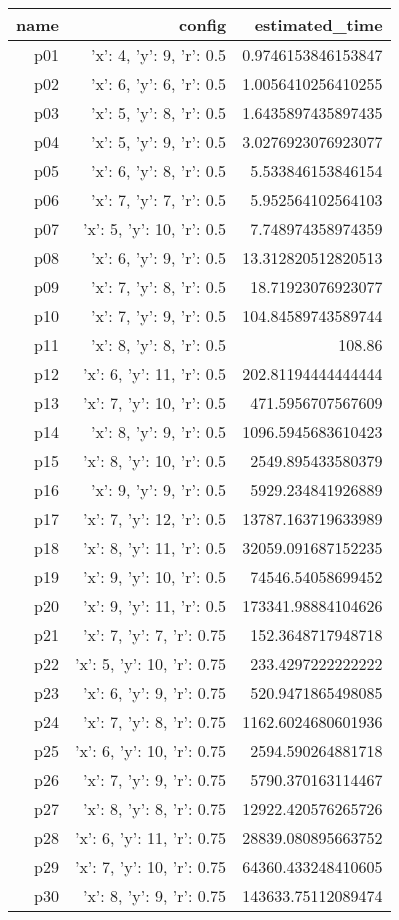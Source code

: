 \documentclass{article}
\begin{document}
                            \begin{center}
                            \scriptsize
                            \begin{tabular}{r|r|r}
                            name & config & estimated\_time\\\midrule
                              p01&{'x': 4, 'y': 9, 'r': 0.5}&0.9746153846153847\\
  p02&{'x': 6, 'y': 6, 'r': 0.5}&1.0056410256410255\\
  p03&{'x': 5, 'y': 8, 'r': 0.5}&1.6435897435897435\\
  p04&{'x': 5, 'y': 9, 'r': 0.5}&3.0276923076923077\\
  p05&{'x': 6, 'y': 8, 'r': 0.5}&5.533846153846154\\
  p06&{'x': 7, 'y': 7, 'r': 0.5}&5.952564102564103\\
  p07&{'x': 5, 'y': 10, 'r': 0.5}&7.748974358974359\\
  p08&{'x': 6, 'y': 9, 'r': 0.5}&13.312820512820513\\
  p09&{'x': 7, 'y': 8, 'r': 0.5}&18.71923076923077\\
  p10&{'x': 7, 'y': 9, 'r': 0.5}&104.84589743589744\\
  p11&{'x': 8, 'y': 8, 'r': 0.5}&108.86\\
  p12&{'x': 6, 'y': 11, 'r': 0.5}&202.81194444444444\\
  p13&{'x': 7, 'y': 10, 'r': 0.5}&471.5956707567609\\
  p14&{'x': 8, 'y': 9, 'r': 0.5}&1096.5945683610423\\
  p15&{'x': 8, 'y': 10, 'r': 0.5}&2549.895433580379\\
  p16&{'x': 9, 'y': 9, 'r': 0.5}&5929.234841926889\\
  p17&{'x': 7, 'y': 12, 'r': 0.5}&13787.163719633989\\
  p18&{'x': 8, 'y': 11, 'r': 0.5}&32059.091687152235\\
  p19&{'x': 9, 'y': 10, 'r': 0.5}&74546.54058699452\\
  p20&{'x': 9, 'y': 11, 'r': 0.5}&173341.98884104626\\
  p21&{'x': 7, 'y': 7, 'r': 0.75}&152.3648717948718\\
  p22&{'x': 5, 'y': 10, 'r': 0.75}&233.4297222222222\\
  p23&{'x': 6, 'y': 9, 'r': 0.75}&520.9471865498085\\
  p24&{'x': 7, 'y': 8, 'r': 0.75}&1162.6024680601936\\
  p25&{'x': 6, 'y': 10, 'r': 0.75}&2594.590264881718\\
  p26&{'x': 7, 'y': 9, 'r': 0.75}&5790.370163114467\\
  p27&{'x': 8, 'y': 8, 'r': 0.75}&12922.420576265726\\
  p28&{'x': 6, 'y': 11, 'r': 0.75}&28839.080895663752\\
  p29&{'x': 7, 'y': 10, 'r': 0.75}&64360.433248410605\\
  p30&{'x': 8, 'y': 9, 'r': 0.75}&143633.75112089474
                            \end{tabular}
                            \end{center}
                    
\end{document}
